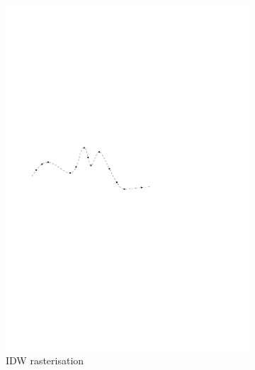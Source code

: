 \begin{figure}
\begin{subfigure}[b]{0.3\linewidth}
    \includegraphics[width=\textwidth,page=4]{figs/1Didw.pdf}
    \caption{IDW rasterisation}\label{fig:fr:idw:a}
  \end{subfigure}
  \qquad
  \quad
  \begin{subfigure}[b]{0.3\linewidth}
    \centering

\end{subfigure}
\end{figure}
